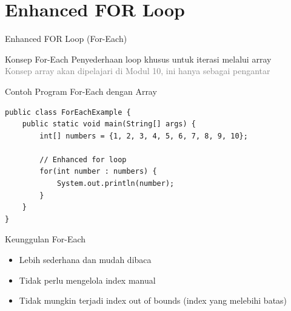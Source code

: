 \documentclass{beamer}
\begin{document}
\section{Enhanced FOR Loop}
\begin{frame}[fragile]{Enhanced FOR Loop (For-Each)}
  \vspace{-0.2cm}
  \begin{block}{Konsep For-Each}
    \vspace{-0.2cm}
    Penyederhaan loop khusus untuk iterasi melalui array\\
    \scriptsize\textcolor{gray}{Konsep array akan dipelajari di Modul 10, ini hanya sebagai pengantar}
  \end{block}

  \vspace{-0.2cm}
  \begin{exampleblock}{Contoh Program For-Each dengan Array}
    \begin{lstlisting}[basicstyle=\ttfamily\scriptsize]
public class ForEachExample {
    public static void main(String[] args) {
        int[] numbers = {1, 2, 3, 4, 5, 6, 7, 8, 9, 10};
        
        // Enhanced for loop
        for(int number : numbers) {
            System.out.println(number);
        }
    }
}
    \end{lstlisting}
  \end{exampleblock}

  \vspace{-0.5cm}
  \begin{block}{Keunggulan For-Each}
  \vspace{-0.2cm}
    \begin{itemize}
      \item \scriptsize Lebih sederhana dan mudah dibaca
      \item \scriptsize Tidak perlu mengelola index manual
      \item \scriptsize Tidak mungkin terjadi index out of bounds (index yang melebihi batas)
    \end{itemize}
  \end{block}
\end{frame}

\end{document}
